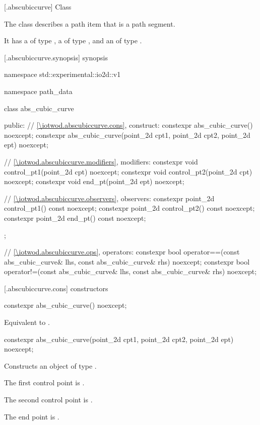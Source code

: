  [\iotwod.abscubiccurve] {Class }

\pnum
{}%
The class  describes a path item that is a path segment.

\pnum
It has a  of type , a  of type , and an  of type .

 [\iotwod.abscubiccurve.synopsis] { synopsis}

\begin{codeblock}
namespace std::experimental::io2d::v1 {
  namespace path_data {
    class abs_cubic_curve {
    public:
      // \ref{\iotwod.abscubiccurve.cons}, construct:
      constexpr abs_cubic_curve() noexcept;
      constexpr abs_cubic_curve(point_2d cpt1, point_2d cpt2,
        point_2d ept) noexcept;

      // \ref{\iotwod.abscubiccurve.modifiers}, modifiers:
      constexpr void control_pt1(point_2d cpt) noexcept;
      constexpr void control_pt2(point_2d cpt) noexcept;
      constexpr void end_pt(point_2d ept) noexcept;

      // \ref{\iotwod.abscubiccurve.observers}, observers:
      constexpr point_2d control_pt1() const noexcept;
      constexpr point_2d control_pt2() const noexcept;
      constexpr point_2d end_pt() const noexcept;
    };
    
    // \ref{\iotwod.abscubiccurve.ops}, operators:
    constexpr bool operator==(const abs_cubic_curve& lhs,
      const abs_cubic_curve& rhs) noexcept;
    constexpr bool operator!=(const abs_cubic_curve& lhs,
      const abs_cubic_curve& rhs) noexcept;
  }
}
\end{codeblock}

 [\iotwod.abscubiccurve.cons] { constructors}

%
\begin{itemdecl}
constexpr abs_cubic_curve() noexcept;
\end{itemdecl}
\begin{itemdescr}
\pnum
\effects
Equivalent to .
\end{itemdescr}

%
\begin{itemdecl}
constexpr abs_cubic_curve(point_2d cpt1, point_2d cpt2,
  point_2d ept) noexcept;
\end{itemdecl}
\begin{itemdescr}
\pnum
\effects
Constructs an object of type .

\pnum
The first control point is .

\pnum
The second control point is .

\pnum
The end point is .
\end{itemdescr}

